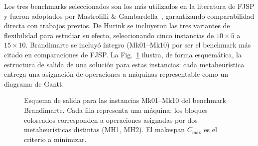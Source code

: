 \documentclass[conference]{IEEEtran}
\begin{document}
Los tres benchmarks seleccionados son los m\'as utilizados en la
literatura de FJSP y fueron adoptados por Mastrolilli \&
Gambardella~\cite{mastrolilli2000}, garantizando comparabilidad
directa con trabajos previos.
De Hurink se incluyeron las tres variantes de flexibilidad para
estudiar su efecto, seleccionando cinco instancias de $10{\times}5$
a $15{\times}10$.
Brandimarte se incluy\'o \'integro (Mk01--Mk10) por ser el benchmark
m\'as citado en comparaciones de FJSP.
La Fig.~\ref{fig:salida_mk} ilustra, de forma esquem\'atica, la
estructura de salida de una soluci\'on para estas instancias: cada
metaheur\'istica entrega una asignaci\'on de operaciones a m\'aquinas
representable como un diagrama de Gantt.

\begin{figure}[!t]
\centering
{}
\caption{Esquema de salida para las instancias Mk01--Mk10 del benchmark
Brandimarte. Cada fila representa una m\'aquina; los bloques coloreados
corresponden a operaciones asignadas por dos metaheur\'isticas distintas
(MH1, MH2). El makespan $C_{\max}$ es el criterio a minimizar.}
\label{fig:salida_mk}
\end{figure}
\end{document}
